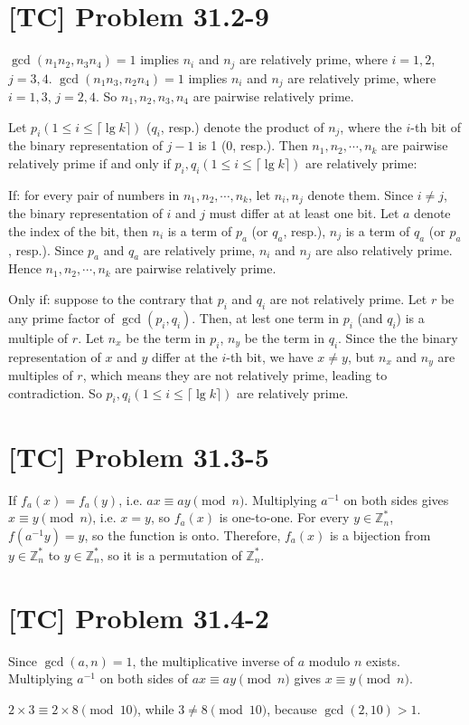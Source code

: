 \documentclass[a4paper,11pt,twocolumn]{article}
\begin{document}
  \section{[TC] Problem 31.2-9}
  $\gcd(n_1n_2, n_3n_4) = 1$ implies $n_i$ and $n_j$ are relatively prime, where $i = 1, 2$, $j = 3, 4$. $\gcd(n_1n_3, n_2n_4) = 1$ implies $n_i$ and $n_j$ are relatively prime, where $i = 1, 3$, $j = 2, 4$. So $n_1, n_2, n_3, n_4$ are pairwise relatively prime.

  Let $p_i (1 \leq i \leq \lceil \lg k \rceil)$ ($q_i$, resp.) denote the product of $n_j$, where the $i$-th bit of the binary representation of $j-1$ is 1 (0, resp.). Then $n_1, n_2, \cdots, n_k$ are pairwise relatively prime if and only if $p_i, q_i (1 \leq i \leq \lceil \lg k \rceil)$ are relatively prime:

  If: for every pair of numbers in $n_1, n_2, \cdots, n_k$, let $n_i, n_j$ denote them. Since $i \neq j$, the binary representation of $i$ and $j$ must differ at at least one bit. Let $a$ denote the index of the bit, then $n_i$ is a term of  $p_a$ (or $q_a$, resp.), $n_j$ is a term of $q_a$ (or $p_a$, resp.). Since $p_a$ and $q_a$ are relatively prime, $n_i$ and $n_j$ are also relatively prime. Hence $n_1, n_2, \cdots, n_k$ are pairwise relatively prime.

  Only if: suppose to the contrary that $p_i$ and $q_i$ are not relatively prime. Let $r$ be any prime factor of $\gcd(p_i, q_i)$. Then, at lest one term in $p_i$ (and $q_i$) is a multiple of $r$. Let $n_x$ be the term in $p_i$, $n_y$ be the term in $q_i$. Since the the binary representation of $x$ and $y$ differ at the $i$-th bit, we have $x \neq y$, but $n_x$ and $n_y$ are multiples of $r$, which means they are not relatively prime, leading to contradiction. So $p_i, q_i (1 \leq i \leq \lceil \lg k \rceil)$ are relatively prime.

  \section{[TC] Problem 31.3-5}
  If $f_a(x) = f_a(y)$, i.e. $ax \equiv ay \pmod n$. Multiplying $a^{-1}$ on both sides gives $x \equiv y \pmod n$, i.e. $x = y$, so $f_a(x)$ is one-to-one. For every $y \in \mathbb{Z}_n^*$, $f(a^{-1}y) = y$, so the function is onto. Therefore, $f_a(x)$ is a bijection from $y \in \mathbb{Z}_n^*$ to $y \in \mathbb{Z}_n^*$, so it is a permutation of $\mathbb{Z}_n^*$.

  \section{[TC] Problem 31.4-2}
  Since $\gcd(a, n) = 1$, the multiplicative inverse of $a$ modulo $n$ exists. Multiplying $a^{-1}$ on both sides of $ax \equiv ay \pmod n$ gives $x \equiv y \pmod n$. \par
  $2 \times 3 \equiv 2 \times 8 \pmod{10}$, while $3 \neq 8 \pmod{10}$, because $\gcd(2, 10) > 1$.
  
\end{document}
